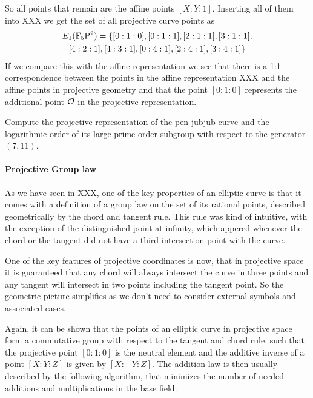 \begin{example}
So all points that remain are the affine points $[X:Y:1]$. Inserting all of them into XXX we get the set of all projective curve points as
\begin{multline*}
E_1(\mathbb{F}_5\mathrm{P}^2)=\{[0:1:0], [0:1:1], [2:1:1], [3:1:1], \\ [4:2:1], [4:3:1], [0:4:1], [2:4:1], [3:4:1]\}
\end{multline*}
If we compare this with the affine representation we see that there is a 1:1 correspondence between the points in the affine representation XXX and the affine points in projective geometry and that the point $[0:1:0]$ represents the additional point $\mathcal{O}$ in the projective representation.
\end{example} 
\begin{exercise}
Compute the projective representation of the pen-jubjub curve and the logarithmic order of its large prime order subgroup with respect to the generator $(7,11)$.
\end{exercise}
\paragraph{Projective Group law}
As we have seen in XXX, one of the key properties of an elliptic curve is that it comes with a definition of a group law on the set of its rational points, described geometrically by the chord and tangent rule. This rule was kind of intuitive, with the exception of the distinguished point at infinity, which appered whenever the chord or the tangent did not have a third intersection point with the curve.

One of the key features of projective coordinates is now, that in projective space it is guaranteed that any chord will always intersect the curve in three points and any tangent will intersect in two points including the tangent point. So the geometric picture simplifies as we don't need to consider external symbols and associated cases.

Again, it can be shown that the points of an elliptic curve in projective space form a commutative group with respect to the tangent and chord rule, such that the projective point $[0:1:0]$ is the neutral element and the additive inverse of a point $[X:Y:Z]$ is given by $[X:-Y:Z]$. The addition law is then usually described by the following algorithm, that minimizes the number of needed additions and multiplications in the base field. 

